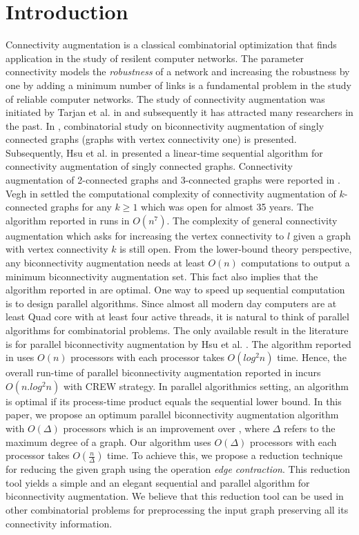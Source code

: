 \documentclass[runningheads]{llncs}
\begin{document}
\section{Introduction}
Connectivity augmentation is a classical combinatorial optimization that finds application in the study of resilent computer networks.  The parameter connectivity models the {\em robustness} of a network and increasing the robustness by one by adding a minimum number of links is a fundamental problem in the study of reliable computer networks.  The study of connectivity augmentation was initiated by Tarjan et al. in \cite{tarjan} and subsequently it has attracted many researchers in the past.   In \cite{tarjan}, combinatorial study on biconnectivity augmentation of singly connected graphs (graphs with vertex connectivity one) is presented.  Subsequently, Hsu et al. in \cite{hsu} presented a linear-time sequential algorithm for connectivity augmentation of singly connected graphs.  Connectivity augmentation of 2-connected graphs and 3-connected graphs were reported in \cite{a,b}.  Vegh in \cite{vegh} settled the computational complexity of connectivity augmentation of $k$-connected graphs for any $k \geq 1$ which was open for almost 35 years.   The algorithm reported in \cite{vegh} runs in $O(n^7)$.  The complexity of general connectivity augmentation which asks for increasing the vertex connectivity to $l$ given a graph with vertex connectivity $k$ is still open.  From the lower-bound theory perspective, any biconnectivity augmentation needs at least $O(n)$ computations to output a minimum biconnectivity augmentation set.  This fact also implies that the algorithm reported in \cite{tarjan,hsu} are optimal.  One way to speed up sequential computation is to design parallel algorithms.   Since almost all modern day computers are at least Quad core with at least four active threads, it is natural to think of parallel algorithms for combinatorial problems.  The only available result in the literature is for parallel biconnectivity augmentation by Hsu et al. \cite{hsu}.  The algorithm reported in \cite{hsu} uses $O(n)$ processors with each processor takes $O(log^2n)$ time.  Hence, the overall run-time of parallel biconnectivity augmentation reported in \cite{hsu} incurs $O(n.log^2n)$ with CREW strategy.   In parallel algorithmics setting, an algorithm is optimal if its process-time product equals the sequential lower bound.   In this paper, we propose an optimum parallel biconnectivity augmentation algorithm with $O(\Delta)$ processors which is an improvement over \cite{hsu}, where $\Delta$ refers to the maximum degree of a graph.  Our algorithm uses $O(\Delta)$ processors with each processor takes $O(\frac{n}{\Delta})$ time.  To achieve this, we propose a reduction technique for reducing the given graph using the operation {\em edge contraction}.  This reduction tool yields a simple and an elegant sequential and parallel algorithm for biconnectivity augmentation.  We believe that this reduction tool can be used in other combinatorial problems for preprocessing the input graph preserving all its connectivity information.       \\ \\
\end{document}
